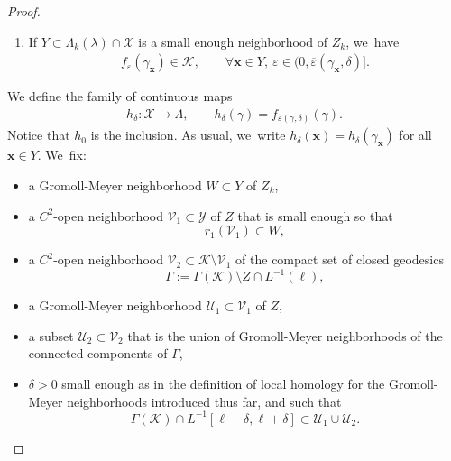 \documentclass[JEP,XML,SOM,Unicode,NoFloatCountersInSection,published]{cedram}
\let\epsilon\varepsilon
\let\bm\boldsymbol
\newcommand{\KK}{\mathcal{K}}
\newcommand{\UU}{\mathcal{U}}
\newcommand{\VV}{\mathcal{V}}
\newcommand{\XX}{\mathcal{X}}
\newcommand{\YY}{\mathcal{Y}}
\newcommand{\xx}{\bm{x}}
\theoremstyle{plain}
\theoremstyle{definition}
\begin{document}
\begin{proof}
\begin{enumerate}
\item\label{l:finitely_generatediii}
If $Y\subset\Lambda_k(\lambda)\cap\XX$ is a small enough neighborhood of $Z_k$, we~have
\begin{align*}
f_\epsilon(\gamma_{\xx})\in\KK,\qquad\forall\xx\in Y,\ \epsilon\in(0,\overline\epsilon(\gamma_{\xx},\delta)].
\end{align*}
\end{enumerate}
We define the family of continuous maps
\begin{align*}
h_\delta:\XX\to\Lambda,
\qquad h_\delta(\gamma)=f_{\overline\epsilon(\gamma,\delta)}(\gamma).
\end{align*}
Notice that $h_0$ is the inclusion.
As usual, we~write $h_\delta(\xx)=h_\delta(\gamma_{\xx})$ for all $\xx\in Y$. We~fix:
\begin{itemize}
\item a Gromoll-Meyer neighborhood $W\subset Y$ of $Z_k$,

\item a $C^2$-open neighborhood $\VV_1\subset\YY$ of $Z$ that is small enough so that
\[
r_1(\VV_1)\subset W,
\]

\item a $C^2$-open neighborhood $\VV_2\subset\KK\setminus\VV_1$ of the compact set of closed geodesics
\[
\Gamma:=\Gamma(\KK)\setminus Z\cap L^{-1}(\ell),
\]

\item a Gromoll-Meyer neighborhood $\UU_1\subset\VV_1$ of $Z$,

\item a subset $\UU_2\subset\VV_2$ that is the union of Gromoll-Meyer neighborhoods of the connected components of $\Gamma$,

\item $\delta>0$ small enough as in the definition of local homology for the Gromoll-Meyer neighborhoods introduced thus far, and such that
\[
\Gamma(\KK)\cap L^{-1}[\ell-\delta,\ell+\delta]\subset\UU_1\cup\UU_2.
\]
\end{itemize}


\end{proof}
\end{document}
